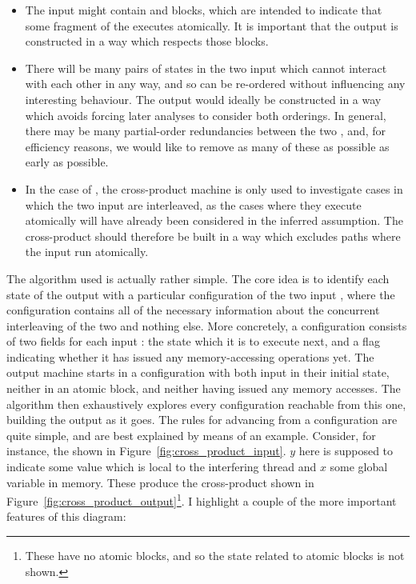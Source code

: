 \begin{itemize}
\item The input {\StateMachines} might contain  and
   blocks, which are intended to indicate that some
  fragment of the {\StateMachine} executes atomically.  It is
  important that the output {\StateMachine} is constructed in a way
  which respects those blocks.
\item There will be many pairs of states in the two input
  {\StateMachines} which cannot interact with each other in any way,
  and so can be re-ordered without influencing any interesting
  behaviour.  The output {\StateMachine} would ideally be constructed
  in a way which avoids forcing later analyses to consider both
  orderings.  In general, there may be many partial-order redundancies
  between the two {\StateMachines}, and, for efficiency reasons, we
  would like to remove as many of these as possible as early as
  possible.
\item In the case of {\technique}, the cross-product machine is only
  used to investigate cases in which the two input {\StateMachines}
  are interleaved, as the cases where they execute atomically will
  have already been considered in the inferred assumption.  The
  cross-product {\StateMachine} should therefore be built in a way
  which excludes paths where the input {\StateMachines} run
  atomically.
\end{itemize}

The algorithm used is actually rather simple.  The core idea is to
identify each state of the output {\StateMachine} with a particular
configuration of the two input {\StateMachines}, where the
configuration contains all of the necessary information about the
concurrent interleaving of the two {\StateMachines} and nothing else.
More concretely, a configuration consists of two fields for each input
{\StateMachine}: the state which it is to execute next, and a flag
indicating whether it has issued any memory-accessing operations yet.
The output machine starts in a configuration with both input
{\StateMachines} in their initial state, neither in an atomic block,
and neither having issued any memory accesses.  The algorithm then
exhaustively explores every configuration reachable from this one,
building the output {\StateMachine} as it goes.  The rules for
advancing from a configuration are quite simple, and are best
explained by means of an example.  Consider, for instance, the
{\StateMachines} shown in Figure~\ref{fig:cross_product_input}.  $y$
here is supposed to indicate some value which is local to the
interfering thread {\StateMachine} and $x$ some global variable in
memory.  These produce the cross-product {\StateMachine} shown in
Figure~\ref{fig:cross_product_output}\footnote{These {\StateMachines}
  have no atomic blocks, and so the state related to atomic blocks is
  not shown.}.  I highlight a couple of the more important features of
this diagram:

